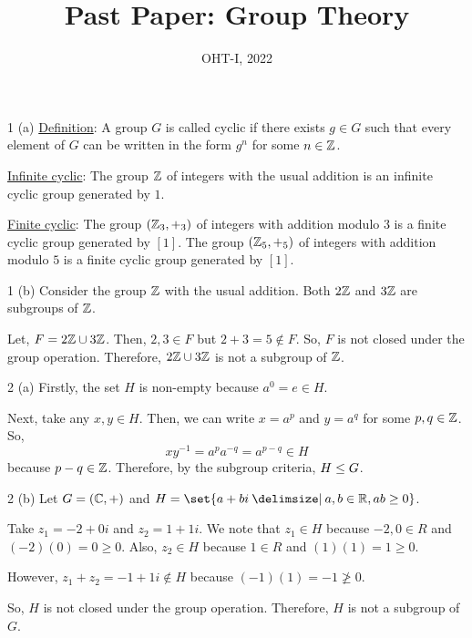 \documentclass[11pt]{penrose}
\title{Past Paper: Group Theory}
\subtitle{OHT-I, 2022}
\begin{document}
\maketitle
\warningtext

\begin{problem}{1 (a)}
    \underline{Definition}: A group $G$ is called cyclic if there exists $g \in G$ such that every element of $G$ can be written in the form $g^n$ for some $n \in \mathbb{Z}$.

    \underline{Infinite cyclic}: The group $\mathbb{Z}$ of integers with the usual addition is an infinite cyclic group generated by $1$.
    
    \underline{Finite cyclic}: The group $(\mathbb{Z}_3, +_3)$ of integers with addition modulo $3$ is a finite cyclic group generated by $[1]$. The group $(\mathbb{Z}_5, +_5)$ of integers with addition modulo $5$ is a finite cyclic group generated by $[1]$.
\end{problem}

\begin{problem}{1 (b)}
    Consider the group $\mathbb{Z}$ with the usual addition. Both $2\mathbb{Z}$ and $3\mathbb{Z}$ are subgroups of $\mathbb{Z}$. 

    Let, $F = 2\mathbb{Z} \cup 3\mathbb{Z}$. Then, $2, 3 \in F$ but $2+3 = 5 \notin F$. So, $F$ is not closed under the group operation. Therefore, $2\mathbb{Z} \cup 3\mathbb{Z}$ is not a subgroup of $\mathbb{Z}$.
\end{problem}

\begin{problem}{2 (a)}
    Firstly, the set $H$ is non-empty because $a^0 = e \in H$.

    Next, take any $x, y \in H$. Then, we can write $x = a^p$ and $y = a^q$ for some $p, q \in \mathbb{Z}$. So,
    \begin{equation*}
        x y^{-1} = a^p a^{-q} = a^{p-q} \in H
    \end{equation*}
    because $p-q \in \mathbb{Z}$. Therefore, by the subgroup criteria, $H \mathrel{\leq} G$.
\end{problem}

\begin{problem}{2 (b)}
    Let $G = (\mathbb{C}, +)$ and $H = \set{a+bi \st a,b \in \R, ab \geq 0}$.

    Take $z_1 = -2 + 0i$ and $z_2 = 1 + 1i$. We note that $z_1 \in H$ because $-2, 0 \in R$ and $(-2)(0) = 0 \geq 0$. Also, $z_2 \in H$ because $1 \in R$ and $(1)(1) = 1 \geq 0$.

    However, $z_1 + z_2 = -1 + 1i \notin H$ because $(-1)(1) = -1 \ngeq 0$.

    So, $H$ is not closed under the group operation. Therefore, $H$ is not a subgroup of $G$.
\end{problem}
\end{document}
